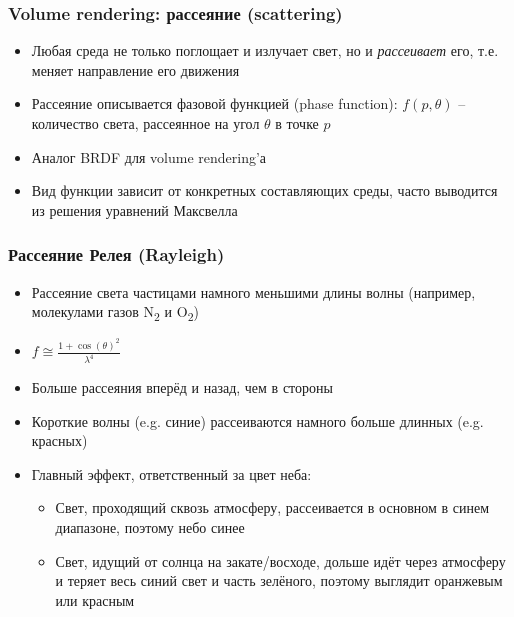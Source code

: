 \documentclass[10pt]{beamer}
\begin{document}
\begin{frame}[fragile]
\frametitle{Volume rendering: рассеяние (scattering)}
\begin{itemize}
\item Любая среда не только поглощает и излучает свет, но и \textit{рассеивает} его, т.е. меняет направление его движения
\pause
\item Рассеяние описывается фазовой функцией (phase function): \begin{math}f(p, \theta)\end{math} -- количество света, рассеянное на угол \begin{math}\theta\end{math} в точке \begin{math}p\end{math}
\pause
\item Аналог BRDF для volume rendering'а
\pause
\item Вид функции зависит от конкретных составляющих среды, часто выводится из решения уравнений Максвелла
\end{itemize}
\end{frame}

\begin{frame}[fragile]
\frametitle{Рассеяние Релея (Rayleigh)}
\begin{itemize}
\item Рассеяние света частицами намного меньшими длины волны (например, молекулами газов N\textsubscript{2} и O\textsubscript{2})
\pause
\item \begin{math}f \cong \frac{1+\cos(\theta)^2}{\lambda^4}\end{math}
\pause
\item Больше рассеяния вперёд и назад, чем в стороны
\pause
\item Короткие волны (e.g. синие) рассеиваются намного больше длинных (e.g. красных)
\pause
\item Главный эффект, ответственный за цвет неба:
\pause
\begin{itemize}
\item Свет, проходящий сквозь атмосферу, рассеивается в основном в синем диапазоне, поэтому небо синее
\pause
\item Свет, идущий от солнца на закате/восходе, дольше идёт через атмосферу и теряет весь синий свет и часть зелёного, поэтому выглядит оранжевым или красным
\end{itemize}
\end{itemize}
\end{frame}
\end{document}
